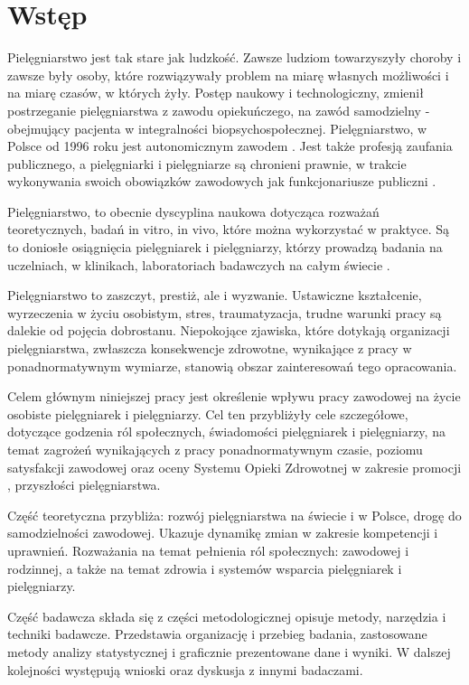 \documentclass[a4paper,12pt,twoside,openright]{mwrep}
\begin{document}
\chapter*{Wstęp}

Pielęgniarstwo jest tak stare jak ludzkość. Zawsze ludziom towarzyszyły choroby i zawsze były osoby, które rozwiązywały problem na miarę własnych możliwości i na miarę czasów, w których żyły. Postęp naukowy i technologiczny, zmienił postrzeganie pielęgniarstwa z zawodu opiekuńczego, na zawód samodzielny - obejmujący pacjenta w integralności biopsychospołecznej. Pielęgniarstwo, w Polsce od 1996 roku jest autonomicznym zawodem \cite{konst97art17}. Jest także profesją zaufania publicznego, a pielęgniarki i pielęgniarze są chronieni prawnie, w trakcie wykonywania swoich obowiązków zawodowych jak funkcjonariusze publiczni \cite{art4uozp}.

Pielęgniarstwo, to obecnie dyscyplina naukowa dotycząca rozważań teoretycznych, badań in vitro, in vivo, które można wykorzystać w praktyce. Są to doniosłe osiągnięcia pielęgniarek i pielęgniarzy, którzy prowadzą badania na uczelniach, w klinikach, laboratoriach badawczych na całym świecie \cite{nursingresearch}.

Pielęgniarstwo to zaszczyt, prestiż, ale i wyzwanie. Ustawiczne kształcenie, wyrzeczenia w życiu osobistym, stres, traumatyzacja, trudne warunki pracy są dalekie od pojęcia dobrostanu.  Niepokojące zjawiska, które dotykają organizacji pielęgniarstwa, zwłaszcza konsekwencje zdrowotne, wynikające z pracy w ponadnormatywnym wymiarze, stanowią obszar zainteresowań tego opracowania.

Celem głównym niniejszej pracy jest określenie wpływu pracy zawodowej na życie osobiste pielęgniarek i pielęgniarzy. Cel ten przybliżyły cele szczegółowe, dotyczące godzenia ról społecznych, świadomości pielęgniarek i pielęgniarzy, na temat zagrożeń wynikających z pracy ponadnormatywnym czasie, poziomu satysfakcji zawodowej oraz oceny Systemu Opieki Zdrowotnej w zakresie promocji , przyszłości pielęgniarstwa.

Część teoretyczna przybliża: rozwój pielęgniarstwa na świecie i w Polsce, drogę do samodzielności zawodowej. Ukazuje dynamikę zmian w zakresie kompetencji i uprawnień. Rozważania na temat pełnienia ról społecznych: zawodowej i rodzinnej, a także na temat zdrowia i systemów wsparcia pielęgniarek i pielęgniarzy. 

Część badawcza składa się z części metodologicznej opisuje metody, narzędzia i techniki badawcze. Przedstawia organizację i przebieg badania, zastosowane metody analizy statystycznej i graficznie prezentowane dane i wyniki. W dalszej kolejności występują wnioski oraz dyskusja z innymi badaczami.
\end{document}
